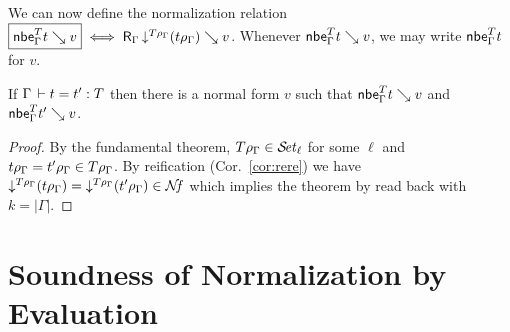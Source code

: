 \documentclass[acmlarge,review,anonymous]{acmart}\settopmatter{printfolios=true}
\begin{document}
We can now define the normalization relation
$\fbox{$\nbe \Gamma T t \evalsto v$} \iff \R {\Gamma} {\down{T \rho_\Gamma} (t \rho_\Gamma)} v$.
Whenever $\nbe \Gamma T t \evalsto v$, we may write $\nbe \Gamma T t$ for $v$.

\begin{theorem}
  If\/ $\Gamma \der t = t' : T$ then there is a normal form $v$ such that
  $\nbe \Gamma T t \evalsto v$ and $\nbe \Gamma T {t'} \evalsto v$.
\end{theorem}
\begin{proof}
  By the fundamental theorem, $T \rho_\Gamma \in \SET[\ell]$ for some $\ell$ and
  $t \rhog = t' \rhog \in T\rhog$.  By reification (Cor.~\ref{cor:rere}) we have
  $\down{T\rhog} (t\rhog) = \down{T\rhog}(t'\rhog) \in \NF$ which implies the theorem
  by read back with $k = |\Gamma|$.
\end{proof}



\section{Soundness  of Normalization by Evaluation}
\label{sec:soundnbe}
\end{document}
